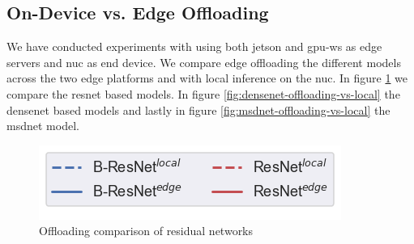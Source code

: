 \subsection{On-Device vs. Edge Offloading}

We have conducted experiments with using both \gls{jetson} and \gls{gpu-ws} as edge servers and \gls{nuc} as end device. We compare edge offloading the different models across the two edge platforms and with local inference on the \gls{nuc}. In figure \ref{fig:resnet-offloading-vs-local} we compare the \gls{resnet} based models. In figure \ref{fig:densenet-offloading-vs-local} the \gls{densenet} based models and lastly in figure \ref{fig:msdnet-offloading-vs-local} the \gls{msdnet} model.

\begin{figure}
	\captionsetup[subfigure]{justification=centering, farskip=0pt,captionskip=0pt}
	\centering
	\includegraphics[width=.3\linewidth]{figures/edge/gpu_b-resnet_offloading_vs_local_legend}
	\hfill
	\hfill
	\caption[Offloading comparison of residual networks]{Offloading comparison of residual networks}
	\label{fig:resnet-offloading-vs-local}
\end{figure}


